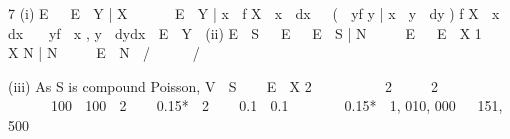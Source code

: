 \documentclass[a4paper,12pt]{article}
\begin{document}
7
(i)
E   E  Y | X      E  Y | x  f X  x  dx   (  yf y | x  y  dy ) f X  x  dx
  yf  x , y  dydx  E  Y 
(ii)
E  S   E   E  S | N     E   E  X 1  X N | N     E  N  /     / 


(iii)
As S is compound Poisson,
V  S    E  X 2 
 
     2 
   2    
     


 100  100  2 

 0.15*  2  
 0.1  0.1   


 0.15*  1, 010, 000 
 151, 500
\end{document}
